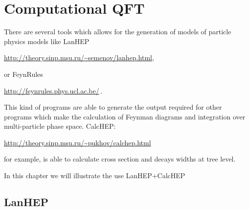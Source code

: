 
\chapter{Computational QFT}

\begin{frame}
There are several tools which allows for the generation of models of particle physics models like LanHEP \cite{Semenov:2008jy} 
\begin{center}
  \url{http://theory.sinp.msu.ru/~semenov/lanhep.html},
\end{center}
or FeynRules \cite{Christensen:2008py}
\begin{center}
  \url{http://feynrules.phys.ucl.ac.be/}\,.
\end{center}

This kind of programs are able to generate the output required for other programs which make the calculation of Feynman diagrams and integration over multi-particle phase space. CalcHEP:
\begin{center}
  \url{http://theory.sinp.msu.ru/~pukhov/calchep.html}
\end{center}
for example, is able to calculate cross section and decays widths at tree level.

\end{frame}

In this chapter we will illustrate the use LanHEP+CalcHEP

\section{LanHEP}

